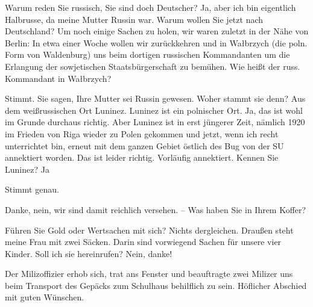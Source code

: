 \documentclass[a5paper,pagesize,10pt,twoside=true]{scrbook}
\renewcommand{\marginpar}[2][]{}
\begin{document}
\begin{dialogue}
	 Warum reden Sie russisch, Sie sind doch Deutscher?
	 Ja, aber ich bin eigentlich Halbrusse, da meine Mutter Russin war.
	 Warum wollen Sie jetzt nach Deutschland?
	 Um noch einige Sachen zu holen, wir waren zuletzt in der Nähe von Berlin: In etwa einer Woche wollen wir zurückkehren und in Wałbrzych (die poln. Form von Waldenburg) uns beim dortigen russischen Kommandanten um die Erlangung der sowjetischen Staatsbürgerschaft zu bemühen.
	 Wie heißt der russ. Kommandant in Wałbrzych?
	
	
	 Stimmt. Sie sagen, Ihre Mutter sei Russin gewesen. Woher stammt sie denn?
	 Aus dem weißrussischen Ort Luninez.
	 Luninez ist ein polnischer Ort.
	 Ja, das ist wohl im Grunde durchaus richtig. Aber Luninez ist in erst jüngerer Zeit, nämlich 1920 im Frieden von Riga wieder zu Polen gekommen und jetzt, wenn ich recht unterrichtet bin, erneut mit dem ganzen Gebiet östlich des Bug von der SU annektiert worden.
	 Das ist leider richtig. Vorläufig annektiert. Kennen Sie Luninez?
	 Ja
	
	
	 Stimmt genau.
	
	
	 Danke, nein, wir sind damit reichlich versehen. -- Was haben Sie in Ihrem Koffer?

	
	 Führen Sie Gold oder Wertsachen mit sich?
	 Nichts dergleichen. Draußen steht meine Frau mit zwei Säcken. Darin sind vorwiegend Sachen für unsere vier Kinder. Soll ich sie hereinrufen?
	 Nein, danke!
\end{dialogue}

Der Milizoffizier erhob sich, trat ans Fenster und beauftragte zwei Milizer uns beim Transport des Gepäcks zum Schulhaus behilflich zu sein. Höflicher Abschied mit \marginpar{121} guten Wünschen.
\end{document}
